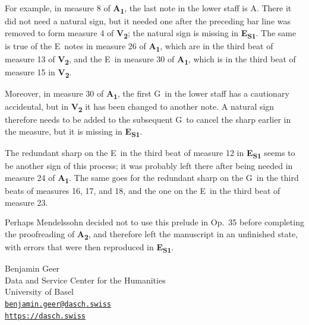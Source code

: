 \documentclass[a4paper, 12pt]{book}
\newcommand{\source}[2]{\textbf{#1\textsubscript{#2}}}
\begin{document}
{    For example, in measure 8 of \source{A}{1}, the last note in the
    lower staff is A\na. There it did not need a natural sign, but it
    needed one after the preceding bar line was removed to form
    measure 4 of \source{V}{2}; the natural sign is missing in
    \source{E}{S1}. The same is true of the E\na\ notes in measure 26 of
    \source{A}{1}, which are in the third beat of measure 13 of
    \source{V}{2}, and the E\na\ in measure 30 of \source{A}{1},
    which is in the third beat of measure 15 in
    \source{V}{2}.

    Moreover, in measure 30 of \source{A}{1}, the first G\na\ in the
    lower staff has a cautionary accidental, but in \source{V}{2} it
    has been changed to another note. A natural sign therefore needs
    to be added to the subsequent G\na\ to cancel the sharp earlier in
    the measure, but it is missing in \source{E}{S1}.

    The redundant sharp on the E\sh\ in the third beat of measure 12
    in \source{E}{S1} seems to be another sign of this process; it was
    probably left there after being needed in measure 24 of
    \source{A}{1}. The same goes for the redundant sharp on the
    G\sh\ in the third beats of measures 16, 17, and 18, and the one
    on the E\sh\ in the third beat of measure 23.

    Perhaps Mendelssohn decided not to use this prelude in Op.\ 35
    before completing the proofreading of \source{A}{2}, and therefore
    left the manuscript in an unfinished state, with errors that were
    then reproduced in \source{E}{S1}.

  }
  {}

\raggedbottom

\vspace{\baselineskip}

\hfill
\begin{minipage}[t]{0.55\textwidth}
  Benjamin Geer \\
  Data and Service Center for the Humanities \\
  University of Basel \\
  \href{mailto:benjamin.geer@dasch.swiss}{\smaller \texttt{benjamin.geer@dasch.swiss}} \\
  \texttt{\url{https://dasch.swiss}}
\end{minipage}

\pagebreak
\cleardoublepage
\mainmatter

\ifdef{\performance}
  {\ifdef{\variant}
    {}
    {}}
  {}
\end{document}
